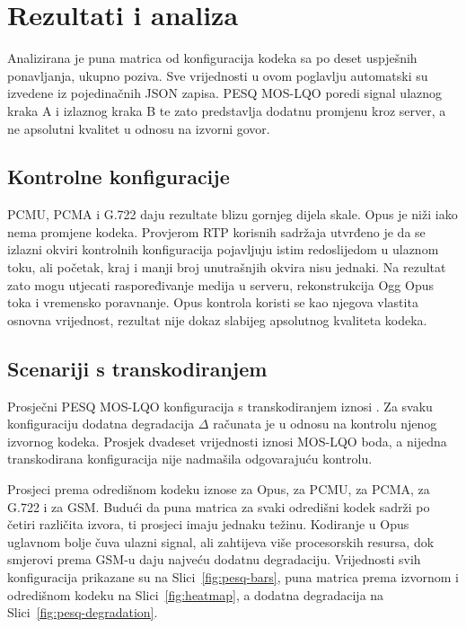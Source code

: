 \chapter{Rezultati i analiza}
\label{ch:rezultati}

Analizirana je puna matrica od \BrojKonfiguracija{} konfiguracija kodeka sa po deset uspješnih ponavljanja, ukupno \BrojPoziva{} poziva. Sve vrijednosti u ovom poglavlju automatski su izvedene iz pojedinačnih JSON zapisa. PESQ MOS-LQO poredi signal ulaznog kraka A i izlaznog kraka B te zato predstavlja dodatnu promjenu kroz server, a ne apsolutni kvalitet u odnosu na izvorni govor.

\section{Kontrolne konfiguracije}



PCMU, PCMA i G.722 daju rezultate blizu gornjeg dijela skale. Opus je niži iako nema promjene kodeka. Provjerom RTP korisnih sadržaja utvrđeno je da se izlazni okviri kontrolnih konfiguracija pojavljuju istim redoslijedom u ulaznom toku, ali početak, kraj i manji broj unutrašnjih okvira nisu jednaki. Na rezultat zato mogu utjecati raspoređivanje medija u serveru, rekonstrukcija Ogg Opus toka i vremensko poravnanje. Opus kontrola koristi se kao njegova vlastita osnovna vrijednost, rezultat nije dokaz slabijeg apsolutnog kvaliteta kodeka.

\section{Scenariji s transkodiranjem}

Prosječni PESQ MOS-LQO konfiguracija s transkodiranjem iznosi \TranscodePESQ. Za svaku konfiguraciju dodatna degradacija $\Delta$ računata je u odnosu na kontrolu njenog izvornog kodeka. Prosjek dvadeset vrijednosti iznosi \RazlikaPESQ{} MOS-LQO boda, a nijedna transkodirana konfiguracija nije nadmašila odgovarajuću kontrolu.



Prosjeci prema odredišnom kodeku iznose \ProsjekPremaOpusu{} za Opus, \ProsjekPremaPCMU{} za PCMU, \ProsjekPremaPCMA{} za PCMA, \ProsjekPremaGSevenTwoTwo{} za G.722 i \ProsjekPremaGSMu{} za GSM. Budući da puna matrica za svaki odredišni kodek sadrži po četiri različita izvora, ti prosjeci imaju jednaku težinu. Kodiranje u Opus uglavnom bolje čuva ulazni signal, ali zahtijeva više procesorskih resursa, dok smjerovi prema GSM-u daju najveću dodatnu degradaciju. Vrijednosti svih konfiguracija prikazane su na Slici~\ref{fig:pesq-bars}, puna matrica prema izvornom i odredišnom kodeku na Slici~\ref{fig:heatmap}, a dodatna degradacija na Slici~\ref{fig:pesq-degradation}.

